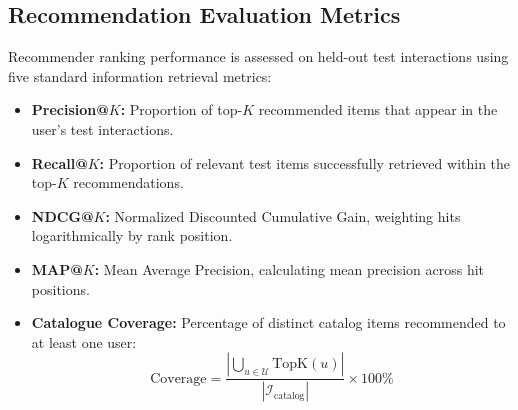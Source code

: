 \documentclass[10pt,a4paper,twoside]{article}
\begin{document}
\subsection{Recommendation Evaluation Metrics}
Recommender ranking performance is assessed on held-out test interactions using five standard information retrieval metrics:
\begin{itemize}
    \item \textbf{Precision@$K$:} Proportion of top-$K$ recommended items that appear in the user's test interactions.
    \item \textbf{Recall@$K$:} Proportion of relevant test items successfully retrieved within the top-$K$ recommendations.
    \item \textbf{NDCG@$K$:} Normalized Discounted Cumulative Gain, weighting hits logarithmically by rank position.
    \item \textbf{MAP@$K$:} Mean Average Precision, calculating mean precision across hit positions.
    \item \textbf{Catalogue Coverage:} Percentage of distinct catalog items recommended to at least one user:
    \begin{equation}
    \text{Coverage} = \frac{|\bigcup_{u \in \mathcal{U}} \text{TopK}(u)|}{|\mathcal{I}_{\text{catalog}}|} \times 100\%
    \end{equation}
\end{itemize}
\end{document}
